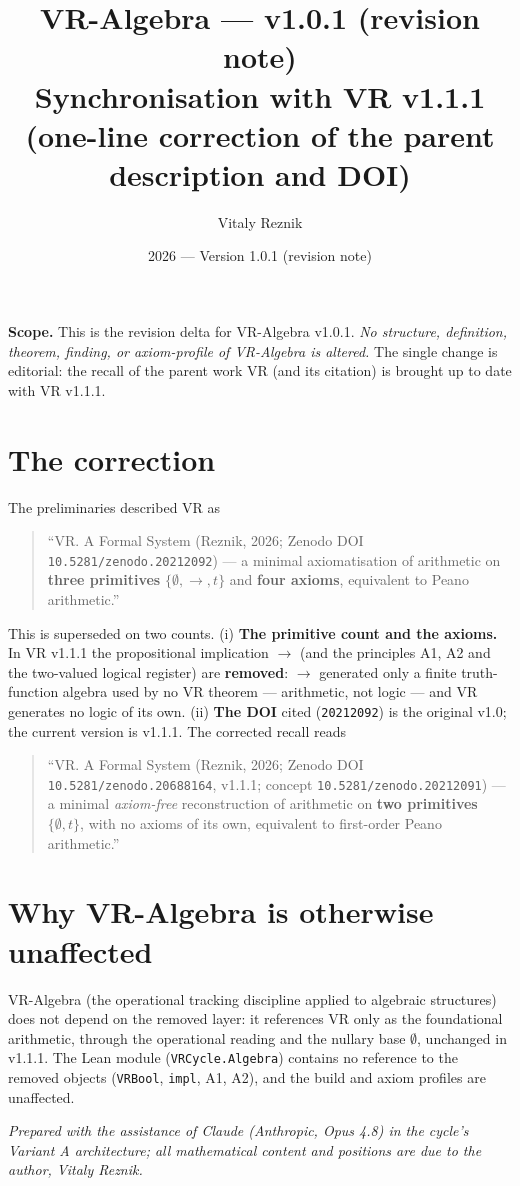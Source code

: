 \documentclass[11pt]{article}
\title{\textbf{VR-Algebra --- v1.0.1 (revision note)}\\[2pt]
\large Synchronisation with VR v1.1.1 (one-line correction of the parent description and DOI)}
\author{Vitaly Reznik}
\date{2026 --- Version 1.0.1 (revision note)}
\begin{document}
\maketitle

\noindent\textbf{Scope.} This is the revision delta for VR-Algebra v1.0.1. \emph{No structure,
definition, theorem, finding, or axiom-profile of VR-Algebra is altered.} The single change is
editorial: the recall of the parent work VR (and its citation) is brought up to date with VR v1.1.1.

\section*{The correction}

The preliminaries described VR as

\begin{quote}
``VR. A Formal System (Reznik, 2026; Zenodo DOI \texttt{10.5281/zenodo.20212092}) --- a minimal
axiomatisation of arithmetic on \textbf{three primitives} $\{\emptyset,\to,t\}$ and \textbf{four
axioms}, equivalent to Peano arithmetic.''
\end{quote}

This is superseded on two counts. (i) \textbf{The primitive count and the axioms.} In VR v1.1.1 the
propositional implication $\to$ (and the principles A1, A2 and the two-valued logical register) are
\textbf{removed}: $\to$ generated only a finite truth-function algebra used by no VR theorem ---
arithmetic, not logic --- and VR generates no logic of its own. (ii) \textbf{The DOI} cited
(\texttt{20212092}) is the original v1.0; the current version is v1.1.1. The corrected recall reads

\begin{quote}
``VR. A Formal System (Reznik, 2026; Zenodo DOI \texttt{10.5281/zenodo.20688164}, v1.1.1; concept
\texttt{10.5281/zenodo.20212091}) --- a minimal \emph{axiom-free} reconstruction of arithmetic on
\textbf{two primitives} $\{\emptyset, t\}$, with no axioms of its own, equivalent to first-order
Peano arithmetic.''
\end{quote}

\section*{Why VR-Algebra is otherwise unaffected}

VR-Algebra (the operational tracking discipline applied to algebraic structures) does not depend on
the removed layer: it references VR only as the foundational arithmetic, through the operational
reading and the nullary base $\emptyset$, unchanged in v1.1.1. The Lean module
(\texttt{VRCycle.Algebra}) contains no reference to the removed objects (\texttt{VRBool},
\texttt{impl}, A1, A2), and the build and axiom profiles are unaffected.

\vfill
\noindent\emph{Prepared with the assistance of Claude (Anthropic, Opus 4.8) in the cycle's Variant A
architecture; all mathematical content and positions are due to the author, Vitaly Reznik.}
\end{document}
